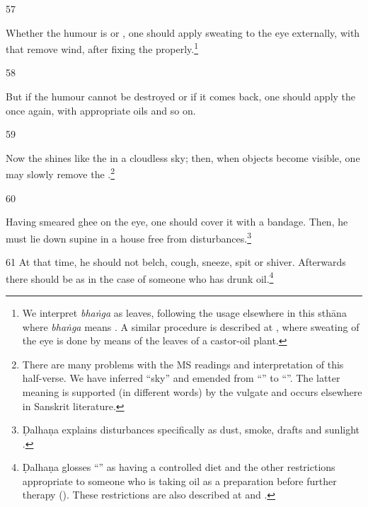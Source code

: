 \begin{translation}
    
    
    \item[57]
    
    
    
    Whether the humour is  or , one should apply
    sweating to the eye externally, with  that remove wind, after
    fixing the  properly.\footnote{We interpret \emph{bhaṅga} as
    leaves, following the usage elsewhere in this sthāna 
    where \emph{bhaṅga} means . A similar procedure is
    described at , where sweating of the eye is done by means of the
    leaves of a castor-oil plant.}
    
    
    \item[58]
    
    But if the humour cannot be destroyed or if it comes back, one should apply the
     once again, with appropriate oils and so on.
    
    
    \item[59]
    
    
    Now the  shines like the  in a cloudless sky; then, 
    when objects become visible, one may slowly remove the 
    .\footnote{There are many problems with the MS readings and 
    interpretation of this half-verse.  We have inferred “sky” and emended from 
    “” to “”.  The 
    latter 
    meaning is supported (in different words) by the vulgate and occurs elsewhere in Sanskrit 
    literature.}
    
    \item[60]
    
    Having smeared ghee on the eye, one should cover it with a bandage.  Then, he must lie 
    down supine in a house free from disturbances.\footnote{Ḍalhaṇa explains disturbances 
    specifically as dust, smoke, drafts and sunlight .} 
    
    \item[61]
    At that time, he should not belch, cough, sneeze, spit or shiver.  Afterwards there should be 
     as in the case of someone who has drunk 
    oil.\footnote{Ḍalhaṇa glosses “” as having a controlled diet 
    and 
    the other restrictions appropriate to someone who is taking oil as a preparation before 
    further 
    therapy (). These restrictions are also described at  
    and   .}
    

\end{translation}
